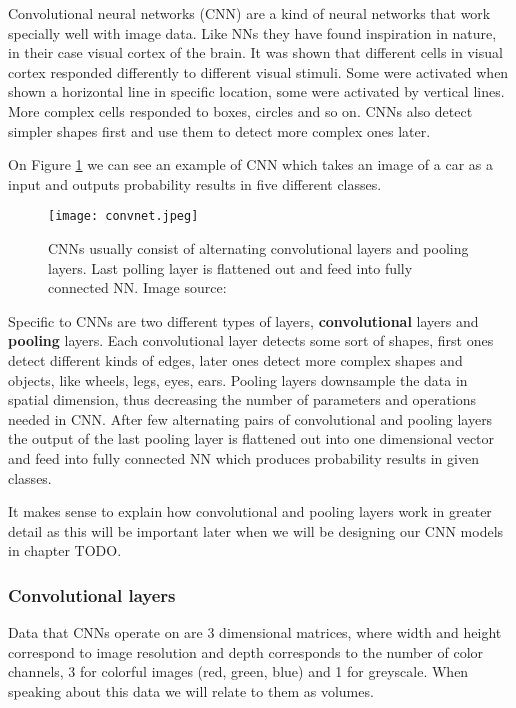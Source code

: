 Convolutional neural networks (CNN) are a kind of neural networks that work specially well with image data.
Like NNs they have found inspiration in nature, in their case visual cortex of the brain\cite{geron}.
It was shown that different cells in visual cortex responded differently to different visual stimuli\cite{cs231n}.
Some were activated when shown a horizontal line in specific location, some were activated by vertical lines.
More complex cells responded to boxes, circles and so on.
CNNs also detect simpler shapes first and use them to detect more complex ones later.

On Figure \ref{convnet} we can see an example of CNN which takes an image of a car as a input and outputs probability results in five different classes.
\newline

\begin{figure}[ht]
        \centering
        \texttt{[image: convnet.jpeg]} 
        \caption{CNNs usually consist of alternating convolutional layers and pooling layers. Last polling layer is flattened out and feed into fully connected NN. Image source:\cite{cs231n}}
        \label{convnet}
\end{figure}

Specific to CNNs are two different types of layers, \textbf{convolutional} layers and \textbf{pooling} layers.
Each convolutional layer detects some sort of shapes, first ones detect different kinds of edges, later ones detect more complex shapes and objects, like wheels, legs, eyes, ears.
Pooling layers downsample the data in spatial dimension, thus decreasing the number of parameters and operations needed in CNN.
After few alternating pairs of convolutional and pooling layers the output of the last pooling layer is flattened out into one dimensional vector and feed into fully connected NN which produces probability results in given classes.

It makes sense to explain how convolutional and pooling layers work in greater detail as this will be important later when we will be designing our CNN models in chapter TODO.


\subsubsection{Convolutional layers}

Data that CNNs operate on are 3 dimensional matrices, where width and height correspond to image resolution and depth corresponds to the number of color channels, 3 for colorful images (red, green, blue) and 1 for greyscale.
When speaking about this data we will relate to them as volumes.

